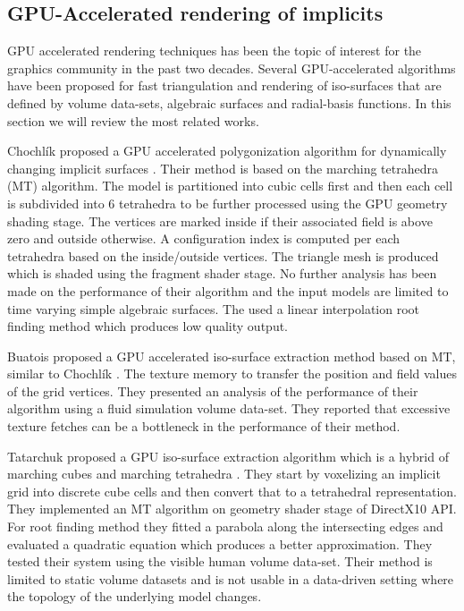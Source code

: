 \subsection{GPU-Accelerated rendering of implicits}
GPU accelerated rendering techniques has been the topic of interest for the graphics community in the past two decades.
Several GPU-accelerated algorithms have been proposed for fast triangulation and rendering of iso-surfaces that are defined by
volume data-sets, algebraic surfaces and radial-basis functions. In this section we will review the most related works.

Chochl{\'i}k \etal proposed a GPU accelerated polygonization algorithm for dynamically changing implicit surfaces \cite{chochlik2012gpu}. 
Their method is based on the marching tetrahedra (MT) algorithm. The model is partitioned into cubic cells first and then each cell is 
subdivided into 6 tetrahedra to be further processed using the GPU geometry shading stage. The vertices are marked inside if their 
associated field is above zero and outside otherwise. A configuration index is computed per each tetrahedra based on the inside/outside 
vertices. The triangle mesh is produced which is shaded using the fragment shader stage. No further analysis has been made on the performance 
of their algorithm and the input models are limited to time varying simple algebraic surfaces. The used a linear interpolation root finding
method which produces low quality output. 

Buatois \etal proposed a GPU accelerated iso-surface extraction method based on MT, similar to Chochl{\'i}k \etal \cite{Buatois2006}. The 
texture memory to transfer the position and field values of the grid vertices. They presented an analysis of the performance of their algorithm
using a fluid simulation volume data-set. They reported that excessive texture fetches can be a bottleneck in the performance of their method.


Tatarchuk \etal proposed a GPU iso-surface extraction algorithm which is a hybrid of marching cubes and marching tetrahedra \cite{Tatarchuk2007}. 
They start by voxelizing an implicit grid into discrete cube cells and then convert that to a tetrahedral representation. They implemented an MT 
algorithm on geometry shader stage of DirectX10 API. For root finding method they fitted a parabola along the intersecting edges and evaluated a 
quadratic equation which produces a better approximation. They tested their system using the visible human volume data-set. Their method
is limited to static volume datasets and is not usable in a data-driven setting where the topology of the underlying model changes. 

